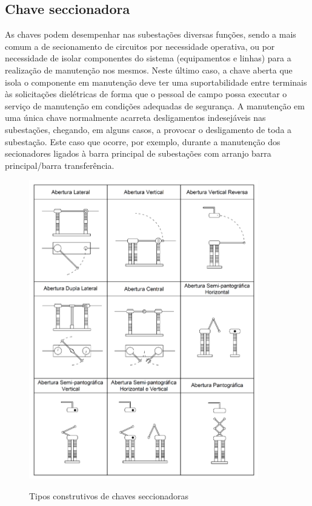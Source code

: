 \documentclass[a5paper]{ufsc-thesis}
\begin{document}
\subsection{Chave seccionadora}
As chaves podem desempenhar nas subestações diversas funções, sendo a mais comum a de secionamento de circuitos por necessidade operativa, ou por necessidade de isolar componentes do sistema (equipamentos e linhas) para a realização de manutenção nos mesmos. Neste último caso, a chave aberta que isola o componente em manutenção deve ter uma suportabilidade entre terminais às solicitações dielétricas de forma que o pessoal de campo possa executar o serviço de manutenção em condições adequadas de segurança. A manutenção em uma única chave normalmente acarreta desligamentos indesejáveis nas subestações, chegando, em alguns casos, a provocar o desligamento de toda a subestação. Este caso que ocorre, por exemplo, durante a manutenção dos secionadores ligados à barra principal de subestações com arranjo barra principal/barra transferência.

\begin{figure}[htb]
  \caption{Tipos construtivos de chaves seccionadoras}
  \centering
  \includegraphics[width=10cm]{chavesec.pdf}
  \label{fig:chavesec}
\end{figure}
\end{document}

